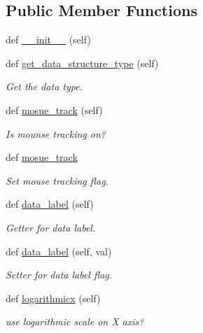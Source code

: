 \subsection*{Public Member Functions}
\begin{DoxyCompactItemize}
\item 
def \hyperlink{classbridges_1_1line__chart_1_1_line_chart_a20c96d892b92624aa367710c9b4386fa}{\+\_\+\+\_\+init\+\_\+\+\_\+} (self)
\item 
def \hyperlink{classbridges_1_1line__chart_1_1_line_chart_a8124cb8693d6564a64264747d6ca5021}{get\+\_\+data\+\_\+structure\+\_\+type} (self)
\begin{DoxyCompactList}\small\item\em Get the data type. \end{DoxyCompactList}\item 
def \hyperlink{classbridges_1_1line__chart_1_1_line_chart_ad189e3efb7abb05944067fc171f6baf8}{mosue\+\_\+track} (self)
\begin{DoxyCompactList}\small\item\em Is mounse tracking on? \end{DoxyCompactList}\item 
def \hyperlink{classbridges_1_1line__chart_1_1_line_chart_a193acd762b88d9e112729adf56cdbcd2}{mosue\+\_\+track}
\begin{DoxyCompactList}\small\item\em Set mouse tracking flag. \end{DoxyCompactList}\item 
def \hyperlink{classbridges_1_1line__chart_1_1_line_chart_a0b93e3215dbaefa1e24bd2881393014c}{data\+\_\+label} (self)
\begin{DoxyCompactList}\small\item\em Getter for data label. \end{DoxyCompactList}\item 
def \hyperlink{classbridges_1_1line__chart_1_1_line_chart_a92796d1738604f9d6417fa7eebb4352e}{data\+\_\+label} (self, val)
\begin{DoxyCompactList}\small\item\em Setter for data label flag. \end{DoxyCompactList}\item 
def \hyperlink{classbridges_1_1line__chart_1_1_line_chart_a7f2d2f772e00af6ce08aa40e1efb195c}{logarithmicx} (self)
\begin{DoxyCompactList}\small\item\em use logarithmic scale on X axis? \end{DoxyCompactList}\item 

\end{DoxyCompactItemize}
